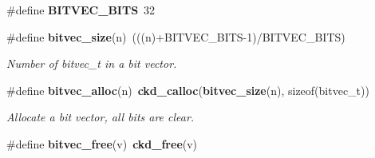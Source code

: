 \begin{DoxyCompactItemize}
\item 
\#define {\bfseries B\-I\-T\-V\-E\-C\-\_\-\-B\-I\-T\-S}~32\label{bitvec_8h_aa992f8d4c7dbe0b71bfd1e01ce279167}

\item 
\#define {\bf bitvec\-\_\-size}(n)~(((n)+B\-I\-T\-V\-E\-C\-\_\-\-B\-I\-T\-S-\/1)/B\-I\-T\-V\-E\-C\-\_\-\-B\-I\-T\-S)\label{bitvec_8h_a1d82193826583f234a71cba32267d3f3}

\begin{DoxyCompactList}\small\item\em Number of bitvec\-\_\-t in a bit vector. \end{DoxyCompactList}\item 
\#define {\bf bitvec\-\_\-alloc}(n)~{\bf ckd\-\_\-calloc}({\bf bitvec\-\_\-size}(n), sizeof(bitvec\-\_\-t))\label{bitvec_8h_a866043a7ac23e137f6c2f2466f4abc70}

\begin{DoxyCompactList}\small\item\em Allocate a bit vector, all bits are clear. \end{DoxyCompactList}\item 
\#define {\bf bitvec\-\_\-free}(v)~{\bf ckd\-\_\-free}(v)\label{bitvec_8h_a5628e35c88ac7e91b99dce916758824a}


\end{DoxyCompactItemize}
